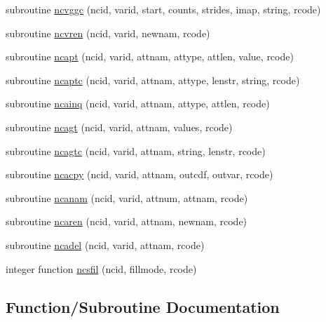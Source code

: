 \begin{DoxyCompactItemize}
\item 
subroutine \hyperlink{nf__fortv2_8f90_aa02cb955f7bb1ae0f370492cfaae7b6f}{ncvggc} (ncid, varid, start, counts, strides, imap, string, rcode)
\item 
subroutine \hyperlink{nf__fortv2_8f90_a8de81d99a1275d61dabb79e14a84c1f6}{ncvren} (ncid, varid, newnam, rcode)
\item 
subroutine \hyperlink{nf__fortv2_8f90_a7572a6d6e1628e2868cef69a3d147c38}{ncapt} (ncid, varid, attnam, attype, attlen, value, rcode)
\item 
subroutine \hyperlink{nf__fortv2_8f90_a525301fbfb8b1e885e1531ed31e16565}{ncaptc} (ncid, varid, attnam, attype, lenstr, string, rcode)
\item 
subroutine \hyperlink{nf__fortv2_8f90_a7b0621bf96d56601f68c18da4ff2e759}{ncainq} (ncid, varid, attnam, attype, attlen, rcode)
\item 
subroutine \hyperlink{nf__fortv2_8f90_a12c954aa7ec21768adf357a69850aa8e}{ncagt} (ncid, varid, attnam, values, rcode)
\item 
subroutine \hyperlink{nf__fortv2_8f90_acdffb4e9e53796cfadcf86a802a159b3}{ncagtc} (ncid, varid, attnam, string, lenstr, rcode)
\item 
subroutine \hyperlink{nf__fortv2_8f90_a251a629393e35281e714774eddea2551}{ncacpy} (ncid, varid, attnam, outcdf, outvar, rcode)
\item 
subroutine \hyperlink{nf__fortv2_8f90_abd5c8126f5ad1171b3944262956899b0}{ncanam} (ncid, varid, attnum, attnam, rcode)
\item 
subroutine \hyperlink{nf__fortv2_8f90_ab82f351050b86a1f5c96a8ef0f5fd46c}{ncaren} (ncid, varid, attnam, newnam, rcode)
\item 
subroutine \hyperlink{nf__fortv2_8f90_aca410e210247338c8c44f4cd02aacdec}{ncadel} (ncid, varid, attnam, rcode)
\item 
integer function \hyperlink{nf__fortv2_8f90_a2182af2d10b5f7be720d59d9c2214cfb}{ncsfil} (ncid, fillmode, rcode)
\end{DoxyCompactItemize}


\subsection{Function/\+Subroutine Documentation}
\mbox{\label{nf__fortv2_8f90_a0e25c674ad6b99068e8c95d7f34f3c8e}} 
